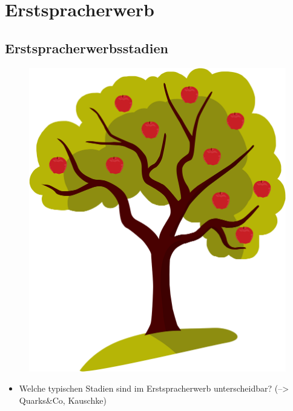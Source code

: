\documentclass[
  letterpaper,
]{scrbook}
\providecommand{\tightlist}{%
  \setlength{\itemsep}{0pt}\setlength{\parskip}{0pt}}\usepackage{longtable,booktabs,array}
\begin{document}
\part{Erstspracherwerb}

\hypertarget{sec-stadien}{%
\chapter{Erstspracherwerbsstadien}\label{sec-stadien}}

\begin{figure}

{\centering 

\href{https://www.clipartmax.com/middle/m2i8K9K9G6i8b1A0_apple-tree-technology/}{\includegraphics[width=1\textwidth,height=\textheight]{./pictures/clipart46442.png}}

}

\end{figure}

\begin{itemize}
\tightlist
\item
  Welche typischen Stadien sind im Erstspracherwerb unterscheidbar?
  (--\textgreater{} Quarks\&Co, Kauschke)
\end{itemize}
\end{document}
